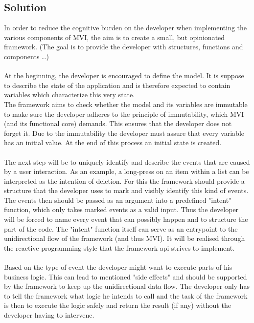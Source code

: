 \subsection{Solution}
\label{subsec:solution}

In order to reduce the cognitive burden on the developer when implementing the various components of MVI, the aim 
is to create a small, but opinionated framework. (The goal is to provide the developer with structures, functions and components \dots) 
\\
\\
At the beginning, the developer is encouraged to define the model. It is suppose to describe the state of the application and is therefore expected to contain
variables which characterize this very state.\\
The framework aims to check whether the model and its variables are immutable to make sure the developer adheres to the principle of immutability,
which MVI (and its functional core) demands. This ensures that the developer does not forget it. Due to the immutability the developer must assure that every variable
has an initial value. At the end of this process an initial state is created.
\\
\\
The next step will be to uniquely identify and describe the events that are caused by a user interaction.
As an example, a long-press on an item within a list can be interpreted as the intention of deletion. 
For this the framework should provide a structure that the developer uses to mark and visibly identify this kind of events.
The events then should be passed as an argument into a predefined "intent" function, which only takes marked events as a valid input.
Thus the developer will be forced to name every event that can possibly happen and to structure the part of the code.
The "intent" function itself can serve as an entrypoint to the unidirectional flow of the framework (and thus MVI). It will be realised 
through the reactive programming style that the framework api strives to implement.
\\
\\
Based on the type of event the developer might want to execute parts of his business logic. This can lead to mentioned "side effects" and
should be supported by the framework to keep up the unidirectional data flow. The developer only has to tell the framework what logic he intends to call and 
the task of the framework is then to execute the logic safely and return the result (if any) without the developer having to intervene.
